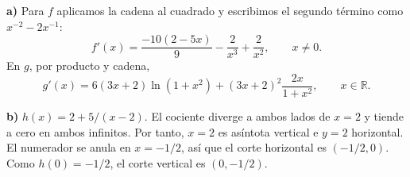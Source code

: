 \textbf{a)} Para $f$ aplicamos la cadena al cuadrado y escribimos el segundo término como $x^{-2}-2x^{-1}$:
\[
f'(x)=\frac{-10(2-5x)}9-\frac{2}{x^3}+\frac{2}{x^2},
\qquad x\ne0.
\]
En $g$, por producto y cadena,
\[
g'(x)=6(3x+2)\ln(1+x^2)+(3x+2)^2\frac{2x}{1+x^2},
\qquad x\in\mathbb R.
\]

\textbf{b)} $h(x)=2+5/(x-2)$. El cociente diverge a ambos lados de $x=2$ y tiende a cero en ambos infinitos. Por tanto, $x=2$ es asíntota vertical e $y=2$ horizontal. El numerador se anula en $x=-1/2$, así que el corte horizontal es $(-1/2,0)$. Como $h(0)=-1/2$, el corte vertical es $(0,-1/2)$.
